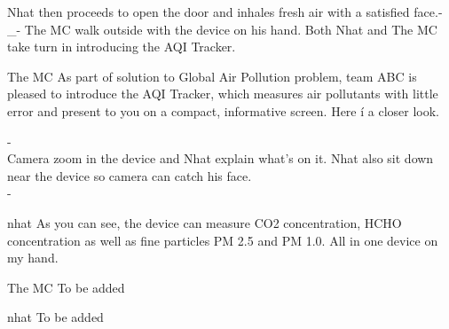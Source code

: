 \documentclass{screenplay}
\begin{document}
Nhat then proceeds to open the door and inhales fresh air with a satisfied face.-\_- 
\newline
\newline
\newline
\newline
\newline
{}
The MC walk outside with the device on his hand. Both Nhat and The MC take turn in introducing the AQI Tracker.

\begin{dialogue}{The MC}
As part of solution to Global Air Pollution problem, team ABC is pleased to introduce the AQI Tracker, which measures air pollutants with little error and present to you on a compact, informative screen. Here í a closer look. 
\end{dialogue}
-\\
Camera zoom in the device and Nhat explain what's on it. Nhat also sit down near the device so camera can catch his face.
\\-\\
\begin{dialogue}{nhat}
As you can see, the device can measure CO2 concentration, HCHO concentration as well as fine particles PM 2.5 and PM 1.0. All in one device on my hand. 
\end{dialogue}
\begin{dialogue}{The MC}
To be added
\end{dialogue}
\begin{dialogue}{nhat}
To be added
\end{dialogue}
\end{document}
